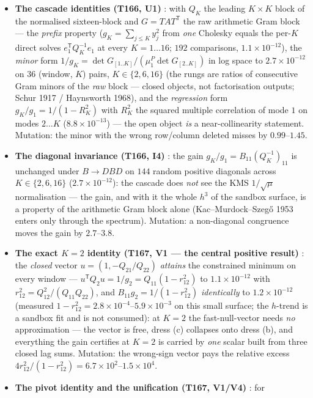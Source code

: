 \documentclass[11pt,a4paper]{article}
\begin{document}
\begin{itemize}[leftmargin=1.5em]
\item \textbf{The cascade identities (T166, U1)} \mE: with $Q_K$ the leading $K\times K$
block of the normalised sixteen-block and $G=TAT^{\mathsf T}$ the raw arithmetic Gram
block --- the \emph{prefix} property ($g_K=\sum_{j\le K}y_j^2$ from \emph{one} Cholesky
equals the per-$K$ direct solves $e_1^{\mathsf T}Q_K^{-1}e_1$ at every $K=1\ldots16$;
$192$ comparisons, $1.1\times10^{-12}$), the \emph{minor} form
$1/g_K=\det G_{[1..K]}/(\mu^P_1\det G_{[2..K]})$ in log space to $2.7\times10^{-12}$ on
$36$ (window, $K$) pairs, $K\in\{2,6,16\}$ (the rungs are ratios of consecutive Gram
minors of the \emph{raw} block --- closed objects, not factorisation outputs; Schur 1917
/ Haynsworth 1968), and the \emph{regression} form $g_K/g_1=1/(1-R_K^2)$ with $R_K^2$
the squared multiple correlation of mode $1$ on modes $2\ldots K$
($8.8\times10^{-13}$) --- the open object \emph{is} a near-collinearity statement.
Mutation: the minor with the wrong row/column deleted misses by $0.99$--$1.45$.
\item \textbf{The diagonal invariance (T166, I4)} \mE: the gain
$g_K/g_1=B_{11}(Q_K^{-1})_{11}$ is unchanged under $B\to DBD$ on $144$ random positive
diagonals across $K\in\{2,6,16\}$ ($2.7\times10^{-12}$): the cascade does \emph{not} see
the KMS $1/\sqrt{\mu}$ normalisation --- the gain, and with it the whole $h^3$ of the
sandbox surface, is a property of the arithmetic Gram block alone (Kac--Murdock--Szeg\H{o}
1953 enters only through the spectrum). Mutation: a non-diagonal congruence moves the
gain by $2.7$--$3.8$.
\item \textbf{The exact $K=2$ identity (T167, V1 --- the central positive result)} \mE:
the \emph{closed} vector $u=(1,-Q_{21}/Q_{22})$ \emph{attains} the constrained minimum
on every window --- $u^{\mathsf T}Q_2u=1/g_2=Q_{11}(1-r_{12}^2)$ to
$1.1\times10^{-12}$ with $r_{12}^2=Q_{12}^2/(Q_{11}Q_{22})$, and
$B_{11}g_2=1/(1-r_{12}^2)$ \emph{identically} to $1.2\times10^{-12}$ (measured
$1-r_{12}^2=2.8\times10^{-4}$--$5.9\times10^{-3}$ on this small surface; the $h$-trend
is a sandbox fit and is not consumed): at $K=2$ the fast-null-vector needs \emph{no}
approximation --- the vector is free, dress (c) collapses onto dress (b), and everything
the gain certifies at $K=2$ is carried by \emph{one} scalar built from three closed lag
sums. Mutation: the wrong-sign vector pays the relative excess
$4r_{12}^2/(1-r_{12}^2)=6.7\times10^{2}$--$1.5\times10^{4}$.
\item \textbf{The pivot identity and the unification (T167, V1/V4)} \mE: for

\end{itemize}
\end{document}
